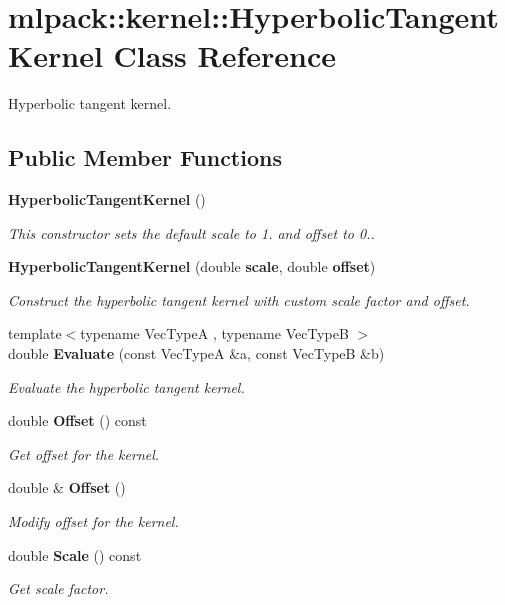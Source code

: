 \section{mlpack\+:\+:kernel\+:\+:Hyperbolic\+Tangent\+Kernel Class Reference}
\label{classmlpack_1_1kernel_1_1HyperbolicTangentKernel}


Hyperbolic tangent kernel.  


\subsection*{Public Member Functions}
\begin{DoxyCompactItemize}
\item 
{\bf Hyperbolic\+Tangent\+Kernel} ()
\begin{DoxyCompactList}\small\item\em This constructor sets the default scale to 1. and offset to 0.. \end{DoxyCompactList}\item 
{\bf Hyperbolic\+Tangent\+Kernel} (double {\bf scale}, double {\bf offset})
\begin{DoxyCompactList}\small\item\em Construct the hyperbolic tangent kernel with custom scale factor and offset. \end{DoxyCompactList}\item 
{\footnotesize template$<$typename Vec\+TypeA , typename Vec\+TypeB $>$ }\\double {\bf Evaluate} (const Vec\+TypeA \&a, const Vec\+TypeB \&b)
\begin{DoxyCompactList}\small\item\em Evaluate the hyperbolic tangent kernel. \end{DoxyCompactList}\item 
double {\bf Offset} () const 
\begin{DoxyCompactList}\small\item\em Get offset for the kernel. \end{DoxyCompactList}\item 
double \& {\bf Offset} ()
\begin{DoxyCompactList}\small\item\em Modify offset for the kernel. \end{DoxyCompactList}\item 
double {\bf Scale} () const 
\begin{DoxyCompactList}\small\item\em Get scale factor. \end{DoxyCompactList}\item 

\end{DoxyCompactItemize}

